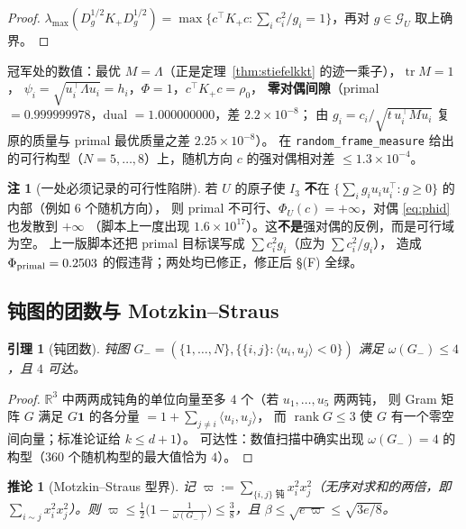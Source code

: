 \documentclass[UTF8,11pt]{ctexart}
\newtheorem{lemma}[theorem]{引理}
\newtheorem{corollary}[theorem]{推论}
\theoremstyle{definition}
\newtheorem{remark}[theorem]{注}
\newcommand{\Lam}{\Lambda}
\newcommand{\tr}{\operatorname{tr}}
\newcommand{\rank}{\operatorname{rank}}
\newcommand{\R}{\mathbb{R}}
\begin{document}
\begin{proof}
$\lambda_{\max}(D_g^{1/2}K_+D_g^{1/2})=\max\{c^\top K_+c:\sum_ic_i^2/g_i=1\}$，再对 $g\in\mathcal G_U$ 取上确界。
\end{proof}

冠军处的数值：最优 $M=\Lam$（正是定理~\ref{thm:stiefelkkt} 的迹一乘子），$\tr M=1$，
$\psi_i=\sqrt{u_i^\top\Lam u_i}=h_i$，$\Phi=1$，$c^\top K_+c=\rho_0$，
\textbf{零对偶间隙}（primal $=0.999999978$，dual $=1.000000000$，差 $2.2\times10^{-8}$；
由 $g_i=c_i/\sqrt{t\,u_i^\top Mu_i}$ 复原的质量与 primal 最优质量之差 $2.25\times10^{-8}$）。
在 \texttt{random\_frame\_measure} 给出的可行构型（$N=5,\dots,8$）上，随机方向 $c$ 的强对偶相对差 $\le1.3\times10^{-4}$。

\begin{remark}[一处必须记录的可行性陷阱]\label{rmk:phitrap}
若 $U$ 的原子使 $I_3$ \textbf{不}在 $\{\sum_ig_iu_iu_i^\top:g\ge0\}$ 的内部（例如 $6$ 个随机方向），
则 primal 不可行、$\Phi_U(c)=+\infty$，对偶 \eqref{eq:phid} 也发散到 $+\infty$
（脚本上一度出现 $1.6\times10^{17}$）。这\textbf{不是}强对偶的反例，而是可行域为空。
上一版脚本还把 primal 目标误写成 $\sum c_i^2g_i$（应为 $\sum c_i^2/g_i$），
造成 $\Phi_{\rm primal}=0.2503$ 的假违背；两处均已修正，修正后 \S(F) 全绿。
\end{remark}

\subsection{钝图的团数与 Motzkin--Straus}\label{sec:r17:ms}

\begin{lemma}[钝团数]\label{lem:obtuseclique}
钝图 $G_-=(\{1,\dots,N\},\{\{i,j\}:\langle u_i,u_j\rangle<0\})$ 满足 $\omega(G_-)\le4$，且 $4$ 可达。
\end{lemma}

\begin{proof}
$\R^3$ 中两两成钝角的单位向量至多 $4$ 个（若 $u_1,\dots,u_5$ 两两钝，
则 Gram 矩阵 $G$ 满足 $G\mathbf 1$ 的各分量 $=1+\sum_{j\ne i}\langle u_i,u_j\rangle$，
而 $\rank G\le3$ 使 $G$ 有一个零空间向量；标准论证给 $k\le d+1$）。
可达性：数值扫描中确实出现 $\omega(G_-)=4$ 的构型（$360$ 个随机构型的最大值恰为 $4$）。
\end{proof}

\begin{corollary}[Motzkin--Straus 型界]\label{cor:ms}
记 $\varpi:=\sum_{\{i,j\}\text{ 钝}}x_i^2x_j^2$（无序对求和的两倍，即 $\sum_{i\sim j}x_i^2x_j^2$）。则
$\varpi\le\frac12\bigl(1-\frac1{\omega(G_-)}\bigr)\le\frac38$，且 $\beta\le\sqrt{e\,\varpi}\le\sqrt{3e/8}$。
\end{corollary}
\end{document}
